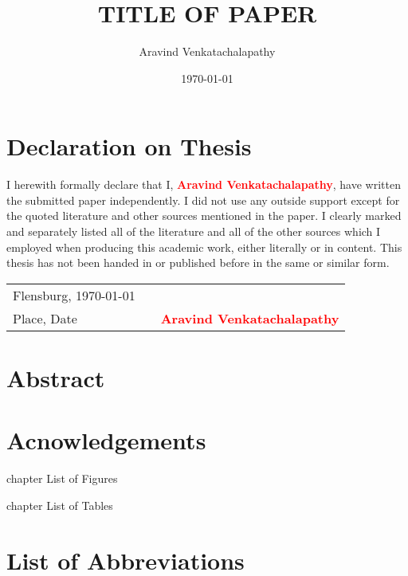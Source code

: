\documentclass[a4paper, 12pt, bibtotoc, toc=chapterentrywithdots, hyphens]{scrreprt}
\title{TITLE OF PAPER}
\author{Aravind Venkatachalapathy}
\date{\today}
\begin{document}
\pagestyle{empty}



\chapter*{Declaration on Thesis}
\thispagestyle{Preamble}

I herewith formally declare that I, \textcolor{red}{\textbf{Aravind Venkatachalapathy}}, have written the submitted paper independently. I did not use any outside support except for the quoted literature and other sources mentioned in the paper. I clearly marked and separately listed all of the literature and all of the other sources which I employed when producing this academic work, either literally or in content. This thesis has not been handed in or published before in the same or similar form.

\vspace{4cm}

\begin{tabular}[h]{l p{2cm} p{7cm}}
Flensburg, \today &  & \\
\cline{1-1}\cline{3-3}
{\small Place, Date}& & {\small \textcolor{red}{\textbf{Aravind Venkatachalapathy}}}\\
\end{tabular}

\chapter*{Abstract}

\newpage
\chapter*{Acnowledgements}
\newpage
{}
\tableofcontents
\thispagestyle{Preamble}

\newpage
\listoffigures
\thispagestyle{Preamble}
 {chapter} {List of Figures}

\newpage
\listoftables
\thispagestyle{Preamble}
 {chapter} {List of Tables}

\newpage
\chapter*{List of Abbreviations}
\thispagestyle{Preamble}
\end{document}
